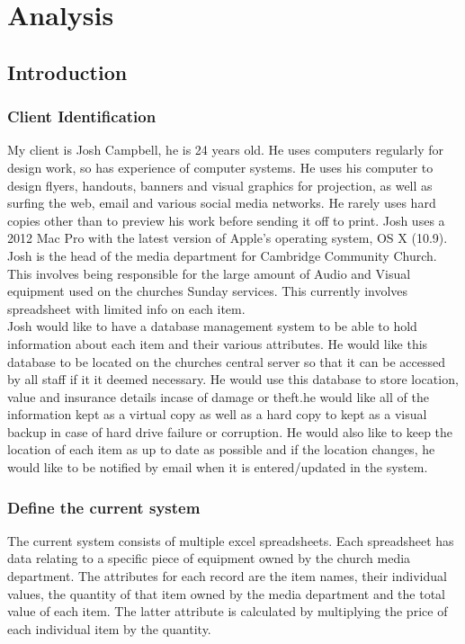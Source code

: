 \chapter{Analysis}

\section{Introduction}

\subsection{Client Identification}

My client is Josh Campbell, he is 24 years old. He uses computers regularly for design work, so has experience of computer systems. He uses his computer to design flyers, handouts, banners and visual graphics for projection, as well as surfing the web, email and various social media networks. He rarely uses hard copies other than to preview his work before sending it off to print. Josh uses a 2012 Mac Pro with the latest version of Apple's operating system, OS X (10.9).\\

\noindent Josh is the head of the media department for Cambridge Community Church. This involves being responsible for the large amount of Audio and Visual equipment used on the churches Sunday services. This currently involves spreadsheet with limited info on each item. \\

\noindent Josh would like to have a database management system to be able to hold information about each item and their various attributes. He would like this database to be located on the churches central server so that it can be accessed by all staff if it it deemed necessary. He would use this database to store location, value and insurance details incase of damage or theft.he would like all of the information kept as a virtual copy as well as a hard copy to kept as a visual backup in case of hard drive failure or corruption. He would also like to keep the location of each item as up to date as possible and if the location changes, he would like to be notified by email when it is entered/updated in the system.

\subsection{Define the current system}

The current system consists of multiple excel spreadsheets. Each spreadsheet has data relating to a specific piece of equipment owned by the church media department. The attributes for each record are the item names, their individual values, the quantity of that item owned by the media department and the total value of each item. The latter attribute is calculated by multiplying the price of each individual item by the quantity. 

